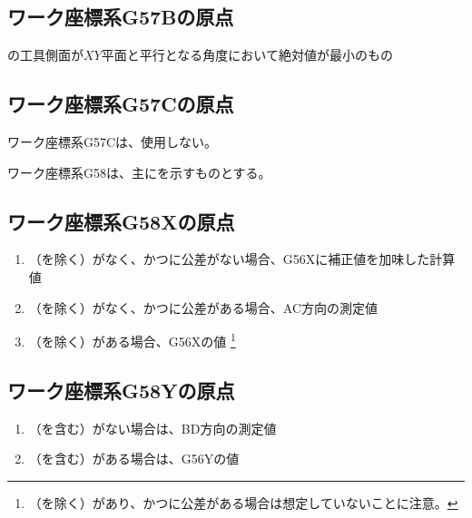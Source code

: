 \subsection{ワーク座標系{\ttfamily G57B}の原点}
\Jig の工具側面が$XY$平面と平行となる角度において絶対値が最小のもの


\subsection{ワーク座標系{\ttfamily G57C}の原点}
ワーク座標系{\ttfamily G57C}は、使用しない。



\clearpage
ワーク座標系{\ttfamily G58}は、主に\KeywayCenter を示すものとする。


\subsection{ワーク座標系{\ttfamily G58X}の原点}
\begin{enumerate}[label*=\sarrow]
\item \TopOutcut（\TopCurvedOutcut を除く）がなく、かつ\AsideKeywayDepth に公差がない場合、{\ttfamily G56X}に補正値を加味した計算値
\item \TopOutcut（\TopCurvedOutcut を除く）がなく、かつ\AsideKeywayDepth に公差がある場合、AC方向\KeywayCenter の測定値
\item \TopOutcut（\TopCurvedOutcut を除く）がある場合、{\ttfamily G56X}の値
\footnote{\TopOutcut（\TopCurvedOutcut を除く）があり、かつ\AsideKeywayDepth に公差がある場合は想定していないことに注意。}
\end{enumerate}


\subsection{ワーク座標系{\ttfamily G58Y}の原点}
\begin{enumerate}[label*=\sarrow]
\item \TopOutcut（\TopCurvedOutcut を含む）がない場合は、BD方向\KeywayCenter の測定値
\item \TopOutcut（\TopCurvedOutcut を含む）がある場合は、{\ttfamily G56Y}の値
\end{enumerate}


